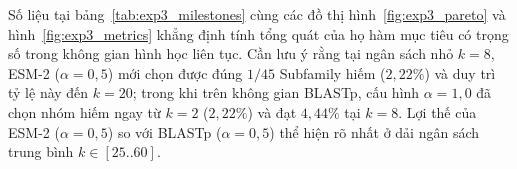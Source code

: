 \begin{table}[htbp!]
\centering
\caption{Hiệu năng bao phủ ngữ nghĩa nội phân họ Within-Subfamily Coverage ESM (\%) qua ba chế độ trọng số $\alpha$ tại các mốc ngân sách chiến lược.}
\label{tab:exp3_milestones}
\vspace{4pt}
\small
{}
\end{table}

Số liệu tại bảng~\ref{tab:exp3_milestones} cùng các đồ thị hình~\ref{fig:exp3_pareto} và hình~\ref{fig:exp3_metrics} khẳng định tính tổng quát của họ hàm mục tiêu có trọng số trong không gian hình học liên tục. Cần lưu ý rằng tại ngân sách nhỏ $k = 8$, ESM-2 ($\alpha = 0{,}5$) mới chọn được đúng $1 / 45$ Subfamily hiếm ($2{,}22\%$) và duy trì tỷ lệ này đến $k = 20$; trong khi trên không gian BLASTp, cấu hình $\alpha = 1{,}0$ đã chọn nhóm hiếm ngay từ $k = 2$ ($2{,}22\%$) và đạt $4{,}44\%$ tại $k = 8$. Lợi thế của ESM-2 ($\alpha = 0{,}5$) so với BLASTp ($\alpha = 0{,}5$) thể hiện rõ nhất ở dải ngân sách trung bình $k \in [25..60]$.

